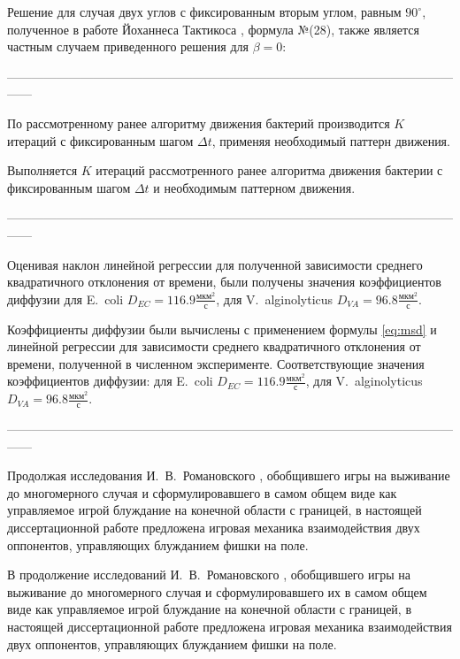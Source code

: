Решение для случая двух углов с фиксированным вторым углом, равным $90^\circ$, полученное в работе Йоханнеса Тактикоса \cite{taktikos_how_2013}, формула №(28), также является частным случаем приведенного решения для $\beta=0$:

------------------------------------------------------------------------------------------------------------------

По рассмотренному ранее алгоритму движения бактерий производится $K$ итераций с фиксированным шагом $\Delta t$, применяя необходимый паттерн движения.

Выполняется $K$ итераций рассмотренного ранее алгоритма движения бактерии с фиксированным шагом $\Delta t$ и необходимым паттерном движения.

------------------------------------------------------------------------------------------------------------------

Оценивая наклон линейной регрессии для полученной зависимости среднего квадратичного отклонения от времени, были получены значения коэффициентов диффузии для E.~coli $D_{EC}=116.9 \frac{\textrm{мкм}^2}{\textrm{с}}$, для V.~alginolyticus $D_{VA}=96.8 \frac{\textrm{мкм}^2}{\textrm{с}}$.


Коэффициенты диффузии были вычислены с применением формулы \cref{eq:msd} и линейной регрессии для зависимости среднего квадратичного отклонения от времени, полученной в численном эксперименте. Соответствующие значения коэффициентов диффузии: для E.~coli $D_{EC}=116.9 \frac{\textrm{мкм}^2}{\textrm{с}}$, для V.~alginolyticus $D_{VA}=96.8 \frac{\textrm{мкм}^2}{\textrm{с}}$.

------------------------------------------------------------------------------------------------------------------

Продолжая исследования И.~В.~Романовского \cite{romanovsky_1961}, обобщившего игры на выживание до многомерного случая и сформулировавшего в самом общем виде как управляемое игрой блуждание на конечной области с границей, в настоящей диссертационной работе предложена игровая механика взаимодействия двух оппонентов, управляющих блужданием фишки на поле.

В продолжение исследований И.~В.~Романовского \cite{romanovsky_1961}, обобщившего игры на выживание до многомерного случая и сформулировавшего их в самом общем виде как управляемое игрой блуждание на конечной области с границей, в настоящей диссертационной работе предложена игровая механика взаимодействия двух оппонентов, управляющих блужданием фишки на поле.

